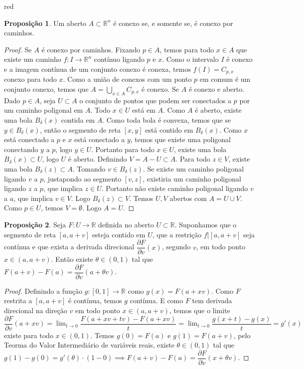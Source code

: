 \documentclass[12pt,leqno,twoside]{amsart}
\theoremstyle{definition}
\newtheorem{proposicao}{Proposição}[section]
\begin{document}
\begin{color}{red}
\begin{proposicao}
	Um aberto $A \subset \mathbb{R}^n$ é conexo se, e somente se, é conexo por caminhos.
\end{proposicao}
\begin{proof}
	Se $A$ é conexo por caminhos. Fixando $p \in A$, temos para todo $x\in A$ que existe um caminho $f:I\to \mathbb{R}^n$ contínuo ligando $p$ e $x$. Como o intervalo $I$ é conexo e a imagem contínua de um conjunto conexo é conexa, temos $f(I) = C_{p,x}$ conexo para todo $x$. Como a união de conexos com um ponto $p$ em comum é um conjunto conexo, temos que $A= \displaystyle\bigcup_{x\in A} C_{p,x}$ é conexo.
	Se $A$ é conexo e aberto. Dado $p \in A$, seja $U \subset A$ o conjunto de pontos que podem ser conectados a $p$ por um caminho poligonal em $A$. Todo $x\in U$ está em $A$. Como $A$ é aberto,  existe uma bola $B_{\delta}(x)$ contida em $A$. Como toda bola é convexa, temos que se $y \in B_{\delta}(x)$, então o segmento de reta $[x,y]$ está contido em $B_{\delta}(x)$. Como  $x$ está conectado a $p$ e $x$ está conectado a $y$, temos que existe uma poligonal conectando $y$ a $p$, logo $y\in U$. Portanto para todo $x\in U$, existe uma bola $B_{\delta}(x) \subset U$, logo $U$ é aberto. Definindo $V = A-U \subset A$. Para todo $z\in V$, existe uma bola $B_{\delta}(z)\subset A$. Tomando $v\in B_{\delta}(z)$. Se existe um caminho poligonal ligando $v$ a $p$, justapondo ao segmento $[v,z]$, existiria um caminho poligonal ligando $z$ a $p$, que implica $z\in U$. Portanto não existe caminho poligonal ligando $v$ a $a$, que implica $v\in V$. Logo $B_{\delta}(z) \subset V$. Temos $U,V$ abertos  com $A= U\cup V$. Como $p\in U$, temos $V = \emptyset$. Logo $A= U$.
\end{proof}

\vspace{0.3cm}

\begin{proposicao}
	Seja $F:U \to \mathbb{R}$ definida no aberto $U\subset \mathbb{R}$.  Suponhamos que o segmento de reta $[a, a + v]$ esteja contido em $U$, que a restrição $f|[a, a + v]$ seja contínua e que exista a derivada direcional $\dfrac{\partial F}{\partial v}(x)$, segundo $v$, em todo ponto $x \in (a, a + v)$. Então existe $\theta \in (0, 1)$  tal que $F(a + v) - F(a) =\dfrac{\partial F}{\partial v}(a + \theta v)$.
\end{proposicao}
\begin{proof}
	Definindo a função $g:[0,1] \to \mathbb{R}$ como $g(x) = F(a+xv)$. Como $F$ restrita a $[a, a+v]$ é contínua, temos $g$ contínua. E como $F$ tem derivada direcional na direção $v$ em todo ponto $x\in (a,a+v)$, temos que o limite $ \dfrac{\partial F}{\partial v} (a+xv) = \displaystyle\lim_{t\to 0} \dfrac{F(a+xv+tv) -F(a +xv)}{t} =  \displaystyle\lim_{t\to 0} \dfrac{g(x+t) -g(x)}{t}= g'(x)$ existe para todo $x \in (0,1)$. Temos $g(0) = F(a)$ e $g(1) = F(a+v)$, pelo Teorma do Valor Intermediário de variáveis reais, existe $\theta \in (0,1)$ tal que $g(1) - g(0) = g'(\theta) \cdot (1-0) \implies F(a+v) - F(a) = \dfrac{\partial F}{\partial v}(x+\theta v) $.
\end{proof}


\end{color}
\end{document}
